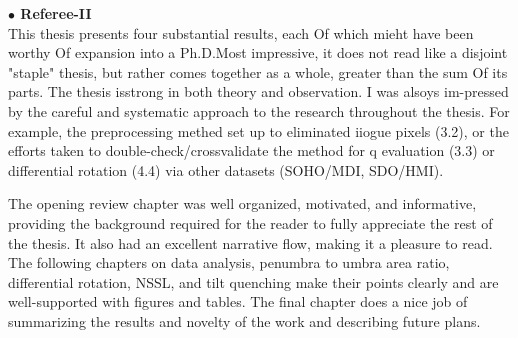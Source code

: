 \documentclass[a4paper, 12pt, twoside]{styles/Thesis}
\begin{document}
{\large {\bf $\bullet$ Referee-II}}\\
\headrule
\vspace{-0.5cm}
This thesis presents four substantial results, each Of which mieht have been worthy Of expansion into a Ph.D.Most impressive, it does not read like a disjoint "staple" thesis, but rather comes together as a whole, greater than the sum Of its
parts. The thesis isstrong in both theory and observation. I was alsoys im-pressed by the careful and systematic approach to the research throughout the thesis. For example, the preprocessing methed set up to eliminated iiogue pixels (3.2), or the efforts taken to double-check/crossvalidate the method for q evaluation (3.3) or differential rotation (4.4) via other datasets (SOHO/MDI, SDO/HMI).

The opening review chapter was well organized, motivated, and informative, providing the background required for the reader to fully appreciate the rest of the
thesis. It also had an excellent narrative flow, making it a pleasure to read. The following chapters on data analysis, penumbra to umbra area ratio, differential rotation, NSSL, and tilt quenching make their points clearly and are well-supported with figures and tables. The final chapter does a nice job of summarizing the results and novelty of the work and describing future plans.
\end{document}
